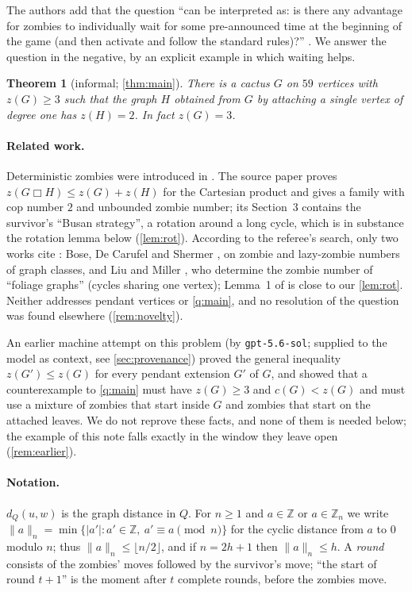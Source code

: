 \documentclass[11pt,a4paper]{article}
\theoremstyle{plain}
\newtheorem{theorem}{Theorem}[section]
\theoremstyle{definition}
\theoremstyle{remark}
\newcommand{\Z}{\mathbb Z}
\newcommand{\cyc}[2]{\lVert #1\rVert_{#2}}
\newcommand{\dist}{d}
\begin{document}
\noindent The authors add that the question ``can be interpreted as: is there any advantage for zombies to individually wait for some pre-announced time at the beginning of the game (and then activate and follow the standard rules)?'' \cite{BBBLN21}. We answer the question in the negative, by an explicit example in which waiting helps.

\begin{theorem}[informal; \cref{thm:main}]
There is a cactus $G$ on $59$ vertices with $z(G)\ge3$ such that the graph $H$ obtained from $G$ by attaching a single vertex of degree one has $z(H)=2$. In fact $z(G)=3$.
\end{theorem}

\paragraph{Related work.} Deterministic zombies were introduced in \cite{FHMP16}. The source paper \cite{BBBLN21} proves $z(G\mathbin{\mdlgwhtsquare}H)\le z(G)+z(H)$ for the Cartesian product and gives a family with cop number $2$ and unbounded zombie number; its Section~3 contains the survivor's ``Busan strategy'', a rotation around a long cycle, which is in substance the rotation lemma below (\cref{lem:rot}). According to the referee's search, only two works cite \cite{BBBLN21}: Bose, De Carufel and Shermer \cite{BDS22}, on zombie and lazy-zombie numbers of graph classes, and Liu and Miller \cite{LM26}, who determine the zombie number of ``foliage graphs'' (cycles sharing one vertex); Lemma~1 of \cite{LM26} is close to our \cref{lem:rot}. Neither addresses pendant vertices or \cref{q:main}, and no resolution of the question was found elsewhere (\cref{rem:novelty}).

An earlier machine attempt on this problem (by \texttt{gpt-5.6-sol}; supplied to the model as context, see \cref{sec:provenance}) proved the general inequality $z(G')\le z(G)$ for every pendant extension $G'$ of $G$, and showed that a counterexample to \cref{q:main} must have $z(G)\ge3$ and $c(G)<z(G)$ and must use a mixture of zombies that start inside $G$ and zombies that start on the attached leaves. We do not reprove these facts, and none of them is needed below; the example of this note falls exactly in the window they leave open (\cref{rem:earlier}).

\paragraph{Notation.} $\dist_Q(u,w)$ is the graph distance in $Q$. For $n\ge1$ and $a\in\Z$ or $a\in\Z_n$ we write $\cyc{a}{n}=\min\{|a'|: a'\in\Z,\ a'\equiv a \pmod n\}$ for the cyclic distance from $a$ to $0$ modulo $n$; thus $\cyc{a}{n}\le\lfloor n/2\rfloor$, and if $n=2h+1$ then $\cyc{a}{n}\le h$. A \emph{round} consists of the zombies' moves followed by the survivor's move; ``the start of round $t+1$'' is the moment after $t$ complete rounds, before the zombies move.
\end{document}
